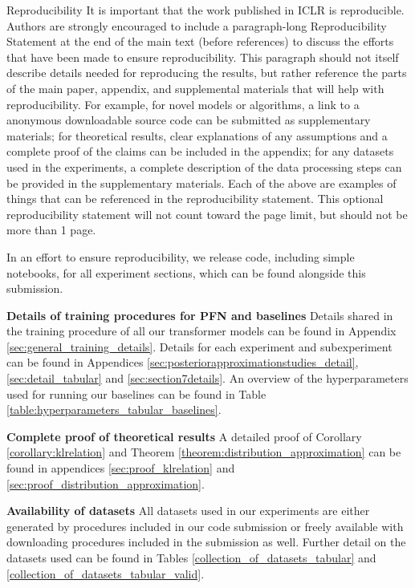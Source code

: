\documentclass{article}
\begin{document}
Reproducibility
It is important that the work published in ICLR is reproducible. Authors are strongly encouraged to include a paragraph-long Reproducibility Statement at the end of the main text (before references) to discuss the efforts that have been made to ensure reproducibility. This paragraph should not itself describe details needed for reproducing the results, but rather reference the parts of the main paper, appendix, and supplemental materials that will help with reproducibility. For example, for novel models or algorithms, a link to a anonymous downloadable source code can be submitted as supplementary materials; for theoretical results, clear explanations of any assumptions and a complete proof of the claims can be included in the appendix; for any datasets used in the experiments, a complete description of the data processing steps can be provided in the supplementary materials. Each of the above are examples of things that can be referenced in the reproducibility statement. This optional reproducibility statement will not count toward the page limit, but should not be more than 1 page.

In an effort to ensure reproducibility, we release code, including simple notebooks, for all experiment sections, which can be found alongside this submission.

\textbf{Details of training procedures for PFN and baselines} Details shared in the training procedure of all our transformer models can be found in Appendix \ref{sec:general_training_details}. Details for each experiment and subexperiment can be found in Appendices \ref{sec:posteriorapproximationstudies_detail}, \ref{sec:detail_tabular} and \ref{sec:section7details}. 
An overview of the hyperparameters used for running our baselines can be found in Table \ref{table:hyperparameters_tabular_baselines}.

\textbf{Complete proof of theoretical results} A detailed proof of Corollary \ref{corollary:klrelation} and Theorem \ref{theorem:distribution_approximation} can be found in appendices \ref{sec:proof_klrelation} and \ref{sec:proof_distribution_approximation}.

\textbf{Availability of datasets} All datasets used in our experiments are either generated by procedures included in our code submission or freely available with downloading procedures included in the submission as well. Further detail on the datasets used can be found in Tables \ref{collection_of_datasets_tabular} and \ref{collection_of_datasets_tabular_valid}.
\fi
\end{document}
